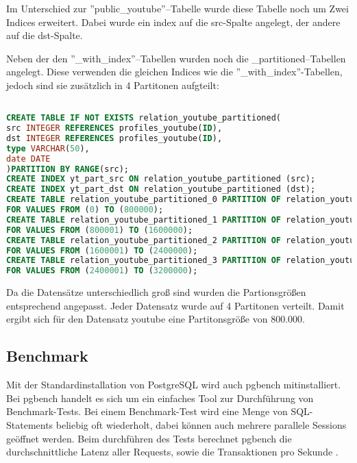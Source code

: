 Im Unterschied zur ''public\_youtube''--Tabelle wurde diese Tabelle noch um Zwei Indices erweitert. Dabei wurde ein index auf die src-Spalte angelegt, der andere auf die dst-Spalte.


Neben der den ''\_with\_index''--Tabellen wurden noch die \_partitioned--Tabellen angelegt. Diese verwenden die gleichen Indices wie die ''\_with\_index''-Tabellen, jedoch sind sie zusätzlich in 4 Partitonen aufgteilt:

\begin{lstlisting}[language=SQL,caption = Partitonierte Tabelle mit Indices anlegen,frame=single, label={2.tabelleIndex.listing} ]

CREATE TABLE IF NOT EXISTS relation_youtube_partitioned(
src INTEGER REFERENCES profiles_youtube(ID),
dst INTEGER REFERENCES profiles_youtube(ID),
type VARCHAR(50),
date DATE
)PARTITION BY RANGE(src);
CREATE INDEX yt_part_src ON relation_youtube_partitioned (src);
CREATE INDEX yt_part_dst ON relation_youtube_partitioned (dst);
CREATE TABLE relation_youtube_partitioned_0 PARTITION OF relation_youtube_partitioned
FOR VALUES FROM (0) TO (800000);
CREATE TABLE relation_youtube_partitioned_1 PARTITION OF relation_youtube_partitioned
FOR VALUES FROM (800001) TO (1600000);
CREATE TABLE relation_youtube_partitioned_2 PARTITION OF relation_youtube_partitioned
FOR VALUES FROM (1600001) TO (2400000);
CREATE TABLE relation_youtube_partitioned_3 PARTITION OF relation_youtube_partitioned
FOR VALUES FROM (2400001) TO (3200000);
\end{lstlisting}

Da die Datensätze unterschiedlich groß sind wurden die Partionsgrößen entsprechend angepasst. Jeder Datensatz wurde auf 4 Partitonen verteilt. Damit ergibt sich für den Datensatz youtube eine Partitonsgröße von 800.000.



\subsection{Benchmark}
Mit der Standardinstallation von PostgreSQL wird auch pgbench mitinstalliert. Bei pgbench handelt es sich um ein einfaches Tool zur Durchführung von Benchmark-Tests. Bei einem Benchmark-Test wird eine Menge von \ac{SQL}-Statements beliebig oft wiederholt, dabei können auch mehrere parallele Sessions geöffnet werden. Beim durchführen des Tests berechnet pgbench die durchschnittliche Latenz aller Requests, sowie die Transaktionen pro Sekunde \cite{postgres2018}.
